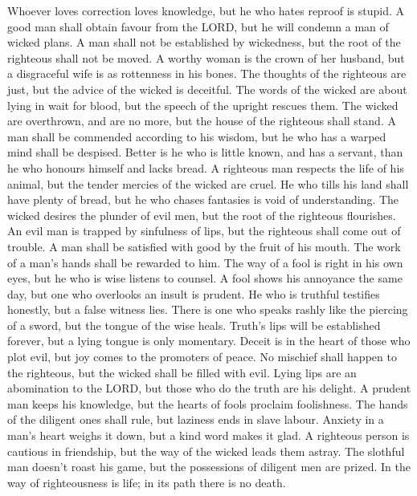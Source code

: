  Whoever loves correction loves knowledge, but he who hates
reproof is stupid.  A good man shall obtain favour from the
LORD, but he will condemn a man of wicked plans.  A man
shall not be established by wickedness, but the root of the righteous
shall not be moved.  A worthy woman is the crown of her
husband, but a disgraceful wife is as rottenness in his bones.
 The thoughts of the righteous are just, but the advice of
the wicked is deceitful.  The words of the wicked are about
lying in wait for blood, but the speech of the upright rescues them.
 The wicked are overthrown, and are no more, but the house
of the righteous shall stand.  A man shall be commended
according to his wisdom, but he who has a warped mind shall be despised.
 Better is he who is little known, and has a servant, than
he who honours himself and lacks bread.  A righteous man
respects the life of his animal, but the tender mercies of the wicked
are cruel.  He who tills his land shall have plenty of
bread, but he who chases fantasies is void of understanding.
 The wicked desires the plunder of evil men, but the root
of the righteous flourishes.  An evil man is trapped by
sinfulness of lips, but the righteous shall come out of trouble.
 A man shall be satisfied with good by the fruit of his
mouth. The work of a man's hands shall be rewarded to him. 
The way of a fool is right in his own eyes, but he who is wise listens
to counsel.  A fool shows his annoyance the same day, but
one who overlooks an insult is prudent.  He who is truthful
testifies honestly, but a false witness lies.  There is one
who speaks rashly like the piercing of a sword, but the tongue of the
wise heals.  Truth's lips will be established forever, but
a lying tongue is only momentary.  Deceit is in the heart
of those who plot evil, but joy comes to the promoters of peace.
 No mischief shall happen to the righteous, but the wicked
shall be filled with evil.  Lying lips are an abomination
to the LORD, but those who do the truth are his delight.  A
prudent man keeps his knowledge, but the hearts of fools proclaim
foolishness.  The hands of the diligent ones shall rule,
but laziness ends in slave labour.  Anxiety in a man's
heart weighs it down, but a kind word makes it glad.  A
righteous person is cautious in friendship, but the way of the wicked
leads them astray.  The slothful man doesn't roast his
game, but the possessions of diligent men are prized.  In
the way of righteousness is life; in its path there is no death.

